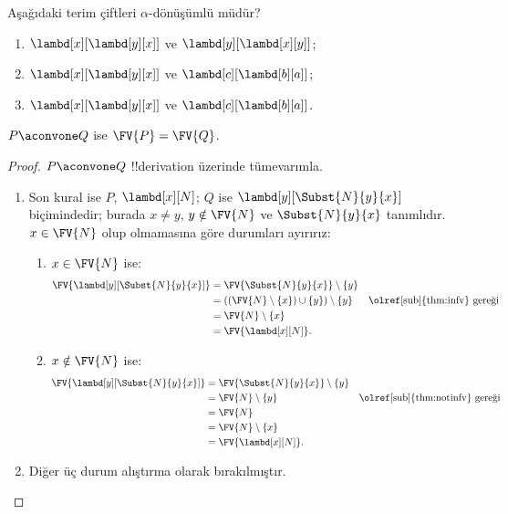 \begin{prob}
  Aşağıdaki terim çiftleri $\alpha$-dönüşümlü müdür?
  \begin{enumerate}
  \item $\lambd[x][\lambd[y][x]]$ ve $\lambd[y][\lambd[x][y]]$;
  \item $\lambd[x][\lambd[y][x]]$ ve $\lambd[c][\lambd[b][a]]$;
  \item $\lambd[x][\lambd[y][x]]$ ve $\lambd[c][\lambd[b][a]]$.
  \end{enumerate}
\end{prob}

\begin{lem}
  $P \aconvone Q$ ise $\FV{P} = \FV{Q}$.
\end{lem}

\begin{proof}
  $P \aconvone Q$ !!{derivation} üzerinde tümevarımla.
  \begin{enumerate}
  \item Son kural  ise $P$, $\lambd[x][N]$;
    $Q$ ise $\lambd[y][\Subst{N}{y}{x}]$ biçimindedir; burada $x\neq y$,
    $y\notin\FV{N}$ ve $\Subst{N}{y}{x}$ tanımlıdır. $x\in\FV{N}$ olup
    olmamasına göre durumları ayırırız:
    \begin{enumerate}
    \item $x \in \FV{N}$ ise:
      \begin{align*}
        \FV{\lambd[y][\Subst{N}{y}{x}]} &=
        \FV{\Subst{N}{y}{x}} \setminus \{y\} \\
        & = ((\FV{N} \setminus \{x\}) \cup \{y\}) \setminus \{y\}
         && \text{\olref[sub]{thm:infv} gereği} \\
        & = \FV{N} \setminus \{x\} \\
        & = \FV{\lambd[x][N]}.
      \end{align*}
    \item $x \notin \FV{N}$ ise:
      \begin{align*}
        \FV{\lambd[y][\Subst{N}{y}{x}]}
        & = \FV{\Subst{N}{y}{x}} \setminus \{y\} \\
        & = \FV{N} \setminus \{y\}
         && \text{\olref[sub]{thm:notinfv} gereği} \\
        & = \FV{N} \\
        & = \FV{N}\setminus\{x\} \\
        & = \FV{\lambd[x][N]}.
      \end{align*}
    \end{enumerate}
  \item Diğer üç durum alıştırma olarak bırakılmıştır.
  \end{enumerate}
\end{proof}

